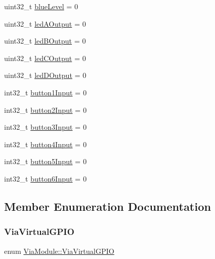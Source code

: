 \begin{DoxyCompactItemize}
uint32\+\_\+t \mbox{\hyperlink{class_via_module_a18580be93f8001ff48a2d413318b79c2}{blue\+Level}} = 0
\item 
uint32\+\_\+t \mbox{\hyperlink{class_via_module_a8bbc2b1b6b811030a29c54eb2267402d}{led\+A\+Output}} = 0
\item 
uint32\+\_\+t \mbox{\hyperlink{class_via_module_abfc55b0fb546b1aae419628d5af83b31}{led\+B\+Output}} = 0
\item 
uint32\+\_\+t \mbox{\hyperlink{class_via_module_a28272e553fd741627d2661b2971f931f}{led\+C\+Output}} = 0
\item 
uint32\+\_\+t \mbox{\hyperlink{class_via_module_a3a36a2d911549950d6eca39b2f05029d}{led\+D\+Output}} = 0
\item 
int32\+\_\+t \mbox{\hyperlink{class_via_module_a8b54c1c283ce508654c6ca3d501d1d4b}{button1\+Input}} = 0
\item 
int32\+\_\+t \mbox{\hyperlink{class_via_module_a2bad7b5f68752daadf61d48f837416f2}{button2\+Input}} = 0
\item 
int32\+\_\+t \mbox{\hyperlink{class_via_module_a37d126e1b41834d01396d745c57c966b}{button3\+Input}} = 0
\item 
int32\+\_\+t \mbox{\hyperlink{class_via_module_a9ada50e4526b70a798cc59a108befcfa}{button4\+Input}} = 0
\item 
int32\+\_\+t \mbox{\hyperlink{class_via_module_a56d68d397aecce9d7ca1c4f36f556586}{button5\+Input}} = 0
\item 
int32\+\_\+t \mbox{\hyperlink{class_via_module_aa4afb6bc99e668e10cdd83dd8f6aeec5}{button6\+Input}} = 0
\end{DoxyCompactItemize}


\subsection{Member Enumeration Documentation}
\mbox{\label{class_via_module_a1b83ad8b5871ad71e582502e9c252eb6}} 
\subsubsection{\texorpdfstring{Via\+Virtual\+G\+P\+IO}{ViaVirtualGPIO}}
{\footnotesize\ttfamily enum \mbox{\hyperlink{class_via_module_a1b83ad8b5871ad71e582502e9c252eb6}{Via\+Module\+::\+Via\+Virtual\+G\+P\+IO}}}

